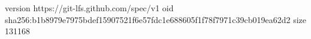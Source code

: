 version https://git-lfs.github.com/spec/v1
oid sha256:b1b8979e7975bdef15907521f6e57fdc1e688605f1f78f7971c39cb019ea62d2
size 131168
